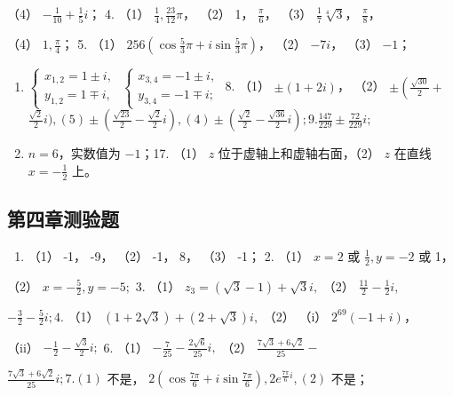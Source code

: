 （4） \(-\frac{1}{10} + \frac{1}{5}i\)； 4. （1）
\(\frac{1}{4}, \frac{23}{12}\pi\)， （2） 1， \(\frac{\pi}{6}\)， （3）
\(\frac{1}{7}\sqrt[4]{3}\)， \(\frac{\pi}{8}\)，

（4） \(1, \frac{\pi}{4}\)； 5. （1）
\(256\left(\cos \frac{5}{3}\pi + i\sin \frac{5}{3}\pi\right)\)， （2）
\(-7i\)， （3） \(-1\)；

\begin{enumerate}[start=6]
\item
  \(\left\{ \begin{array}{l} x_{1,2} = 1 \pm i, \\ y_{1,2} = 1 \mp i, \end{array} \right.\)
  \(\left\{ \begin{array}{l} x_{3,4} = -1 \pm i, \\ y_{3,4} = -1 \mp i; \end{array} \right.\)
  8. （1） \(\pm (1 + 2i)\)， （2）
  \(\pm \left( \frac{\sqrt{30}}{2} + \right.\)\(\frac{\sqrt{2}}{2} i), (5) \pm \left( \frac{\sqrt{23}}{2} - \frac{\sqrt{2}}{2} i \right), (4) \pm \left( \frac{\sqrt{2}}{2} - \frac{\sqrt{36}}{2} i \right); 9. \frac{147}{229} \pm \frac{72}{229} i;\)
\item
  \(n = 6\)，实数值为 \(-1\)；17. （1） \(z\)
  位于虚轴上和虚轴右面，（2） \(z\) 在直线 \(x = -\frac{1}{2}\) 上。
\end{enumerate}

\subsection{第四章测验题}

\begin{enumerate}
\item
  （1） -1， -9， （2） -1， 8， （3） -1； 2. （1） \(x = 2\) 或
  \(\frac{1}{2}, y = -2\) 或 1，
\end{enumerate}

（2） \(x = -\frac{5}{2}, y = -5;\) 3. （1）
\(z_{3} = (\sqrt{3} - 1) + \sqrt{3} i,\) （2）
\(\frac{11}{2} - \frac{1}{2} i,\)

\(-\frac{3}{2} - \frac{5}{2} i; 4.\) （1）
\((1 + 2\sqrt{3}) + (2 + \sqrt{3})i,\) （2） （i） \(2^{69}(-1 + i)\)，

（ii） \(-\frac{1}{2} - \frac{\sqrt{3}}{2} i;\) 6. （1）
\(-\frac{7}{25} - \frac{2\sqrt{6}}{25} i,\) （2）
\(\frac{7\sqrt{3} + 6\sqrt{2}}{25} -\)

\(\frac{7\sqrt{3}+6\sqrt{2}}{25}i;7.(1)\) 不是，
\(2\left(\cos\frac{7\pi}{6}+i\sin\frac{7\pi}{6}\right),2e^{\frac{7\pi}{6}i},(2)\)
不是；


